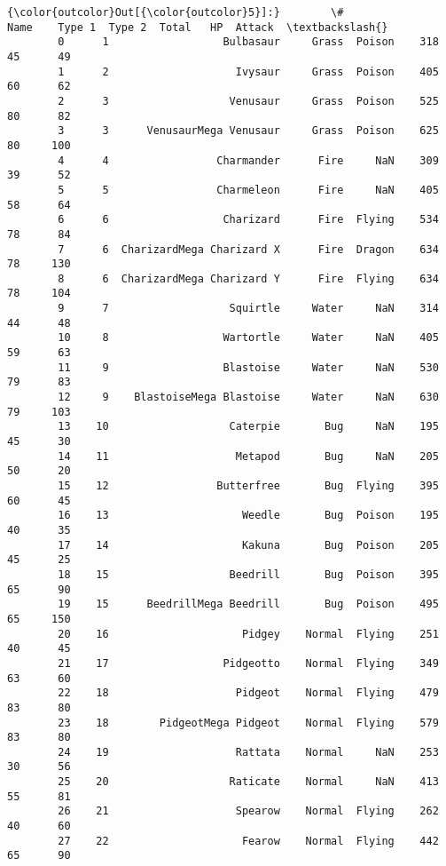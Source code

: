 \documentclass[11pt]{article}
\begin{document}
\begin{Verbatim}[commandchars=\\\{\}]
{\color{outcolor}Out[{\color{outcolor}5}]:}        \#                       Name    Type 1  Type 2  Total   HP  Attack  \textbackslash{}
        0      1                  Bulbasaur     Grass  Poison    318   45      49   
        1      2                    Ivysaur     Grass  Poison    405   60      62   
        2      3                   Venusaur     Grass  Poison    525   80      82   
        3      3      VenusaurMega Venusaur     Grass  Poison    625   80     100   
        4      4                 Charmander      Fire     NaN    309   39      52   
        5      5                 Charmeleon      Fire     NaN    405   58      64   
        6      6                  Charizard      Fire  Flying    534   78      84   
        7      6  CharizardMega Charizard X      Fire  Dragon    634   78     130   
        8      6  CharizardMega Charizard Y      Fire  Flying    634   78     104   
        9      7                   Squirtle     Water     NaN    314   44      48   
        10     8                  Wartortle     Water     NaN    405   59      63   
        11     9                  Blastoise     Water     NaN    530   79      83   
        12     9    BlastoiseMega Blastoise     Water     NaN    630   79     103   
        13    10                   Caterpie       Bug     NaN    195   45      30   
        14    11                    Metapod       Bug     NaN    205   50      20   
        15    12                 Butterfree       Bug  Flying    395   60      45   
        16    13                     Weedle       Bug  Poison    195   40      35   
        17    14                     Kakuna       Bug  Poison    205   45      25   
        18    15                   Beedrill       Bug  Poison    395   65      90   
        19    15      BeedrillMega Beedrill       Bug  Poison    495   65     150   
        20    16                     Pidgey    Normal  Flying    251   40      45   
        21    17                  Pidgeotto    Normal  Flying    349   63      60   
        22    18                    Pidgeot    Normal  Flying    479   83      80   
        23    18        PidgeotMega Pidgeot    Normal  Flying    579   83      80   
        24    19                    Rattata    Normal     NaN    253   30      56   
        25    20                   Raticate    Normal     NaN    413   55      81   
        26    21                    Spearow    Normal  Flying    262   40      60   
        27    22                     Fearow    Normal  Flying    442   65      90   

\end{Verbatim}
\end{document}

